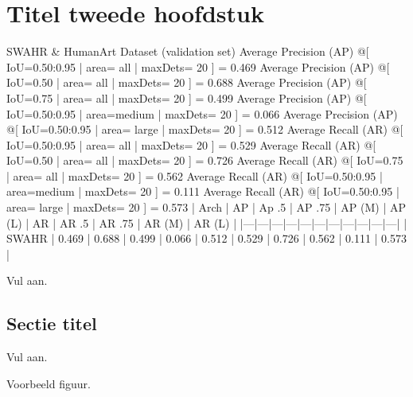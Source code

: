 \chapter{Titel tweede hoofdstuk}
\label{chap:evaluation}

SWAHR & HumanArt Dataset (validation set)
Average Precision  (AP) @[ IoU=0.50:0.95 | area=   all | maxDets= 20 ] = 0.469
 Average Precision  (AP) @[ IoU=0.50      | area=   all | maxDets= 20 ] = 0.688
 Average Precision  (AP) @[ IoU=0.75      | area=   all | maxDets= 20 ] = 0.499
 Average Precision  (AP) @[ IoU=0.50:0.95 | area=medium | maxDets= 20 ] = 0.066
 Average Precision  (AP) @[ IoU=0.50:0.95 | area= large | maxDets= 20 ] = 0.512
 Average Recall     (AR) @[ IoU=0.50:0.95 | area=   all | maxDets= 20 ] = 0.529
 Average Recall     (AR) @[ IoU=0.50      | area=   all | maxDets= 20 ] = 0.726
 Average Recall     (AR) @[ IoU=0.75      | area=   all | maxDets= 20 ] = 0.562
 Average Recall     (AR) @[ IoU=0.50:0.95 | area=medium | maxDets= 20 ] = 0.111
 Average Recall     (AR) @[ IoU=0.50:0.95 | area= large | maxDets= 20 ] = 0.573
| Arch | AP | Ap .5 | AP .75 | AP (M) | AP (L) | AR | AR .5 | AR .75 | AR (M) | AR (L) |
|---|---|---|---|---|---|---|---|---|---|---|
| SWAHR | 0.469 | 0.688 | 0.499 | 0.066 | 0.512 | 0.529 | 0.726 | 0.562 | 0.111 | 0.573 |

Vul aan.

\lipsum[9-10]

\section{Sectie titel}
\label{sec:scalable_faafo}

Vul aan.

\lipsum[10-12]
Voorbeeld figuur.